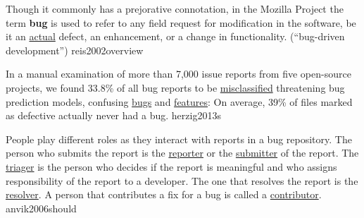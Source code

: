 \documentclass{article}
\begin{document}
  {Though it commonly has a prejorative connotation, in the Mozilla Project the term \textbf{bug} is used to refer to any field request for modification in the software, be it an \ul{actual} defect, an enhancement, or a change in functionality. (``bug-driven development'')}
  {reis2002overview}

  {In a manual examination of more than 7,000 issue reports from five open-source projects, we found 33.8\% of all bug reports to be \ul{misclassified} threatening bug prediction models, confusing \ul{bugs} and \ul{features}: On average, 39\% of files marked as defective actually never had a bug.}
  {herzig2013s}



  {People play different roles as they interact with reports in a bug repository. The person who submits the report is the \ul{reporter} or the \ul{submitter} of the report. The \ul{triager} is the person who decides if the report is meaningful and who assigns responsibility of the report to a developer. The one that resolves the report is the \ul{resolver}. A person that contributes a fix for a bug is called a \ul{contributor}.}
  {anvik2006should}



\end{document}
